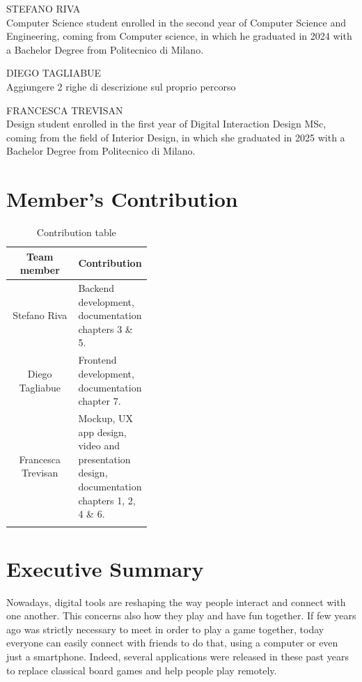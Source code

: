\documentclass[12pt]{article}
\begin{document}
STEFANO RIVA \\ Computer Science student enrolled in the second year of Computer Science and Engineering, coming from Computer science, in which he graduated in 2024 with a Bachelor Degree from Politecnico di Milano.

DIEGO TAGLIABUE \\Aggiungere 2 righe di descrizione sul proprio percorso

FRANCESCA TREVISAN \\ Design student enrolled in the first year of Digital Interaction Design MSc, coming from the field of Interior Design, in which she graduated in 2025 with a Bachelor Degree from Politecnico di Milano.

\section*{Member's Contribution}
    \begin{center}
        \begin{longtable}{|c|p{0.4\linewidth}|}
            \hline
            \textbf{Team member} & \textbf{Contribution} \\
            \hline
            Stefano Riva & Backend development, documentation chapters 3 \& 5.\\
            \hline
            Diego Tagliabue & Frontend development, documentation chapter 7.\\
            \hline
            Francesca Trevisan & Mockup, UX app design, video and presentation design, documentation chapters 1, 2, 4 \& 6.\\
            \hline
            \caption{Contribution table}
            \label{contribution-table}
        \end{longtable}
    \end{center}

\newpage
\tableofcontents

\newpage
\section{Executive Summary}
Nowadays, digital tools are reshaping the way people interact and connect with one another. This concerns also how they play and have fun together. If few years ago was strictly necessary to meet in order to play a game together, today everyone can easily connect with friends to do that, using a computer or even just a smartphone. Indeed, several applications were released in these past years to replace classical board games and help people play  remotely. 
\end{document}
